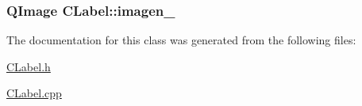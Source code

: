 \subsubsection[{\texorpdfstring{imagen\+\_\+}{imagen_}}]{\setlength{\rightskip}{0pt plus 5cm}Q\+Image C\+Label\+::imagen\+\_\+\hspace{0.3cm}{\ttfamily [private]}}\hypertarget{classCLabel_abc23f3746354e8aac57516f34cb85fba}{}\label{classCLabel_abc23f3746354e8aac57516f34cb85fba}


The documentation for this class was generated from the following files\+:\begin{DoxyCompactItemize}
\item 
\hyperlink{CLabel_8h}{C\+Label.\+h}\item 
\hyperlink{CLabel_8cpp}{C\+Label.\+cpp}\end{DoxyCompactItemize}
